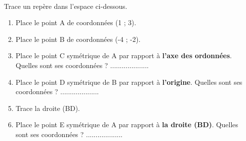 \documentclass[a4paper,11pt]{article}
\newcommand{\myarrow}{-{Latex[length=3mm, width=2mm]}}
\begin{document}
\begin{question}[(7 points)]\

	Trace un repère dans l'espace ci-dessous.
	\begin{enumerate}[1)]
		\item Place le point A de coordonnées (1 ; 3).
		\item Place le point B de coordonnées (-4 ; -2).
		\item Place le point C symétrique de A par rapport à \textbf{l'axe des ordonnées}. Quelles sont ses coordonnées ? ....................
		\item Place le point D symétrique de B par rapport à \textbf{l'origine}. Quelles sont ses coordonnées ? ....................
		\item Trace la droite (BD).
		\item Place le point E symétrique de A par rapport à \textbf{la droite (BD)}.  Quelles sont ses coordonnées ? ...................
	\end{enumerate}
\end{question}




\end{document}
